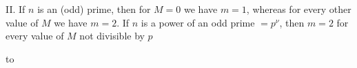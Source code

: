 \par II. If $n$ is an (odd) prime, then for $M=0$ we have $m=1$, whereas for every other value of $M$ we have $m=2$. If $n$ is a power of an odd prime $=p^\nu$, then $m=2$ for every value of $M$ not divisible by $p$\quad\textemdash
\par\nobreak\noindent\hbox to\linewidth{\textemdash\hfil\textemdash\hfil\textemdash\hfil\textemdash\hfil\textemdash\hfil\textemdash\hfil\textemdash\hfil\textemdash\hfil\textemdash\hfil\textemdash\hfil\textemdash\hfil\textemdash\hfil\textemdash\hfil\textemdash\hfil\textemdash\hfil\textemdash\hfil\textemdash}\par
